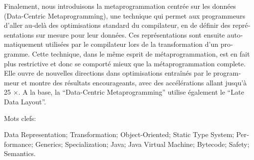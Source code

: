 \begin{otherlanguage}{french}
\vspace{0.5em}

Finalement, nous introduisons la metaprogrammation centrée sur les données (Data-Centric Metaprogramming), une technique qui permet aux programmeurs d'aller au-delà des optimisations standard du compilateur, en de définir des représentations sur mesure pour leur données. Ces représentations sont ensuite automatiquement utilisées par le compilateur lors de la transformation d'un programme. Cette technique, dans le même esprit de métaprogrammation, est en fait plus restrictive et donc se comporté mieux que la métaprogrammation complete. Elle ouvre de nouvelles directions dans optimisations entraînés par le programmeur et montre des résultats encourageants, avec des accélérations allant jusqu'à 25 $\times$. A la base, la “Data-Centric Metaprogramming” utilise également le “Late Data Layout”.

\vspace{0.5em}


Mots clefs:

Data Representation; Transformation; Object-Oriented; Static Type System; Performance; Generics; Specialization; Java; Java Virtual Machine; Bytecode; Safety; Semantics.
\end{otherlanguage}



